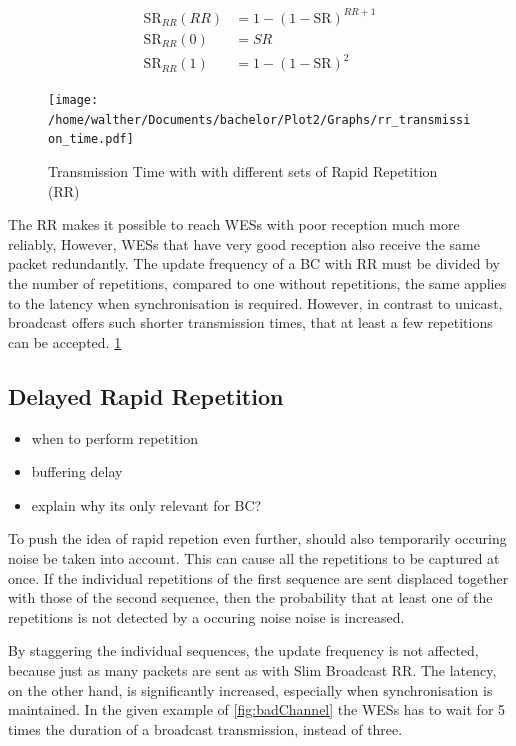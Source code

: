 \begin{align}
	\label{math:rr_sr}
	\text{SR}_{RR}(RR)	&= 1-(1-\text{SR})^{RR+1} \\
	\text{SR}_{RR}(0) 	&= SR \\
	\text{SR}_{RR}(1) 	&= 1-(1-\text{SR})^{2}
\end{align}

\begin{figure}[h]
	\centering
	\texttt{[image: /home/walther/Documents/bachelor/Plot2/Graphs/rr\_transmission\_time.pdf]}
	\caption{Transmission Time with with different sets of Rapid Repetition (RR)}
	\label{fig:rr_analytic}
\end{figure}

The RR makes it possible to reach WESs with poor reception much more reliably,
However, WESs that have very good reception also receive the same packet redundantly.
The update frequency of a BC with RR must be divided by the number of repetitions, compared to one without repetitions,
the same applies to the latency when synchronisation is required.
However, in contrast to unicast, broadcast offers such shorter transmission times,
that at least a few repetitions can be accepted. \cref{fig:rr_analytic}

\subsection{Delayed Rapid Repetition}
\label{sub:DelayedRepetition}
\begin{itemize}
\item when to perform repetition
\item buffering delay
\item explain why its only relevant for BC?
\end{itemize}

To push the idea of rapid repetion even further, should also temporarily occuring noise be taken into account.
This can cause all the repetitions to be captured at once.
If the individual repetitions of the first sequence are sent displaced together with those of the second sequence,
then the probability that at least one of the repetitions is not detected by a occuring noise noise is increased.

By staggering the individual sequences, the update frequency is not affected,
because just as many packets are sent as with Slim Broadcast RR.
The latency, on the other hand, is significantly increased, especially when synchronisation is maintained.
In the given example of \cref{fig:badChannel} the WESs has to wait for 5 times the duration of a broadcast transmission, instead of three.

